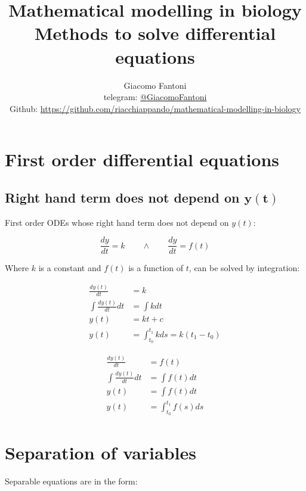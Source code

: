 

\title{\Huge\textbf{{Mathematical modelling in biology}}\\\LARGE Methods to solve differential equations}

\author{
  Giacomo Fantoni \\
  \small telegram: \href{https://t.me/GiacomoFantoni}{@GiacomoFantoni} \\[3pt]
  \small Github: \href{https://github.com/giacThePhantom/mathematical-modelling-in-biology}{https://github.com/riacchiappando/mathematical-modelling-in-biology}\\
}




  \maketitle
  \tableofcontents


\section{First order differential equations}

	\subsection{Right hand term does not depend on $\mathbf{y(t)}$}
	First order ODEs whose right hand term does not depend on $y(t)$:

	$$\frac{dy}{dt} = k\qquad\land\qquad\frac{dy}{dt} = f(t)$$

	Where $k$ is a constant and $f(t)$ is a function of $t$, can be solved by integration:

	\begin{align*}
		\frac{dy(t)}{dt} &= k\\
		\int\frac{dy(t)}{dt}dt &= \int kdt\\
		y(t) &= kt + c\\
		y(t) &=\int_{t_0}^{t_1}kds = k(t_1-t_0)
	\end{align*}

	\begin{align*}
		\frac{dy(t)}{dt} &= f(t)\\
		\int\frac{dy(t)}{dt}dt &= \int f(t)dt\\
		y(t) &= \int f(t)dt\\
		y(t) &= \int_{t_0}^{t_1}f(s)ds
	\end{align*}

\section{Separation of variables}
Separable equations are in the form:

